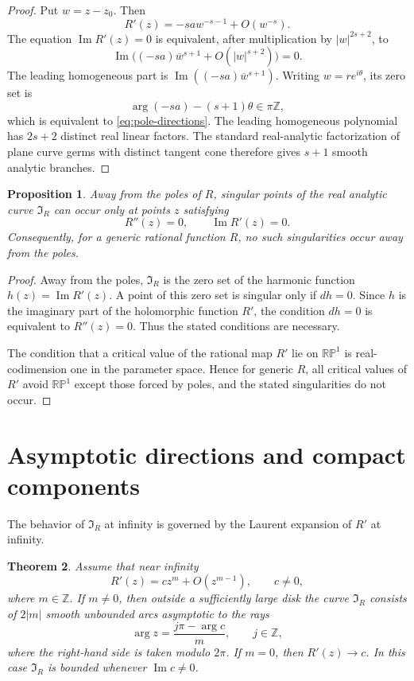 \documentclass[11pt,reqno]{amsart}
\newtheorem{theorem}{Theorem}[section]
\newtheorem{proposition}[theorem]{Proposition}
\theoremstyle{definition}
\theoremstyle{remark}
\newcommand{\RP}{\mathbb {RP}}
\newcommand{\I}{\mathfrak I}
\renewcommand{\Im}{\operatorname{Im}}
\begin{document}
\begin{proof}
Put $w=z-z_0$.  Then
\[
        R'(z)=-sa w^{-s-1}+O(w^{-s}).
\]
The equation $\Im R'(z)=0$ is equivalent, after multiplication by $|w|^{2s+2}$, to
\[
        \Im\bigl((-sa)\overline w^{s+1}+O(|w|^{s+2})\bigr)=0.
\]
The leading homogeneous part is $\Im((-sa)\overline w^{s+1})$.  Writing $w=re^{i\theta}$, its zero set is
\[
        \arg(-sa)-(s+1)\theta\in \pi\mathbb Z,
\]
which is equivalent to \eqref{eq:pole-directions}.  The leading homogeneous polynomial has $2s+2$ distinct real linear factors.  The standard real-analytic factorization of plane curve germs with distinct tangent cone therefore gives $s+1$ smooth analytic branches.
\end{proof}

\begin{proposition}\label{prop:singularities}
Away from the poles of $R$, singular points of the real analytic curve $\I_R$ can occur only at points $z$ satisfying
\[
        R''(z)=0,
        \qquad
        \Im R'(z)=0.
\]
Consequently, for a generic rational function $R$, no such singularities occur away from the poles.
\end{proposition}

\begin{proof}
Away from the poles, $\I_R$ is the zero set of the harmonic function $h(z)=\Im R'(z)$.  A point of this zero set is singular only if $dh=0$.  Since $h$ is the imaginary part of the holomorphic function $R'$, the condition $dh=0$ is equivalent to $R''(z)=0$.  Thus the stated conditions are necessary.

The condition that a critical value of the rational map $R'$ lie on $\RP^1$ is real-codimension one in the parameter space.  Hence for generic $R$, all critical values of $R'$ avoid $\RP^1$ except those forced by poles, and the stated singularities do not occur.
\end{proof}

\section{Asymptotic directions and compact components}

The behavior of $\I_R$ at infinity is governed by the Laurent expansion of $R'$ at infinity.

\begin{theorem}\label{thm:asymptotic}
Assume that near infinity
\[
        R'(z)=c z^m+O(z^{m-1}),
        \qquad c\ne0,
\]
where $m\in\mathbb Z$.  If $m\ne0$, then outside a sufficiently large disk the curve $\I_R$ consists of $2|m|$ smooth unbounded arcs asymptotic to the rays
\begin{equation}\label{eq:asymptotic-rays}
        \arg z=\frac{j\pi-\arg c}{m},
        \qquad j\in\mathbb Z,
\end{equation}
where the right-hand side is taken modulo $2\pi$.  If $m=0$, then $R'(z)\to c$.  In this case $\I_R$ is bounded whenever $\Im c\ne0$.
\end{theorem}
\end{document}
